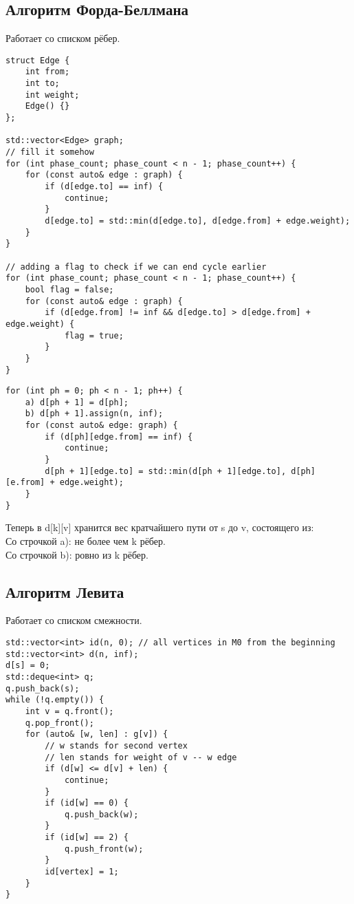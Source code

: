 \documentclass[12pt, a4paper]{article}
\begin{document}
    \subsection*{Алгоритм Форда-Беллмана}
    Работает со списком рёбер.
    \begin{lstlisting}
struct Edge {
    int from;
    int to;
    int weight;
    Edge() {}
};

std::vector<Edge> graph;
// fill it somehow
for (int phase_count; phase_count < n - 1; phase_count++) {
    for (const auto& edge : graph) {
        if (d[edge.to] == inf) {
            continue;
        }
        d[edge.to] = std::min(d[edge.to], d[edge.from] + edge.weight);
    }
}

// adding a flag to check if we can end cycle earlier
for (int phase_count; phase_count < n - 1; phase_count++) {
    bool flag = false;
    for (const auto& edge : graph) {
        if (d[edge.from] != inf && d[edge.to] > d[edge.from] + edge.weight) {
            flag = true;
        }
    }
}
    \end{lstlisting}
    \begin{lstlisting}
for (int ph = 0; ph < n - 1; ph++) {
    a) d[ph + 1] = d[ph];
    b) d[ph + 1].assign(n, inf);
    for (const auto& edge: graph) {
        if (d[ph][edge.from] == inf) {
            continue;
        }
        d[ph + 1][edge.to] = std::min(d[ph + 1][edge.to], d[ph][e.from] + edge.weight);
    }
}
    \end{lstlisting}
    Теперь в d[k][v] хранится вес кратчайшего пути от s до v, состоящего из:\\
    Со строчкой a): не более чем k рёбер.\\
    Со строчкой b): ровно из k рёбер.
    \newpage\subsection*{Алгоритм Левита}
    Работает со списком смежности.
    \begin{lstlisting}
std::vector<int> id(n, 0); // all vertices in M0 from the beginning
std::vector<int> d(n, inf);
d[s] = 0;
std::deque<int> q;
q.push_back(s);
while (!q.empty()) {
    int v = q.front();
    q.pop_front();
    for (auto& [w, len] : g[v]) {
        // w stands for second vertex
        // len stands for weight of v -- w edge 
        if (d[w] <= d[v] + len) {
            continue;
        }
        if (id[w] == 0) {
            q.push_back(w);
        }
        if (id[w] == 2) {
            q.push_front(w);
        }
        id[vertex] = 1;
    }
}
    \end{lstlisting}
\end{document}
